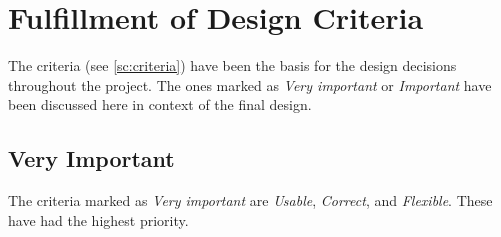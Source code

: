 \section{Fulfillment of Design Criteria}\label{sc:discCriteria}
The criteria (see \autoref{sc:criteria}) have been the basis for the design decisions throughout the project. The ones marked as \textit{Very important} or \textit{Important} have been discussed here in context of the final design.

\subsection{Very Important} \label{ssc:discCriteriaVeryImportant}
The criteria marked as \textit{Very important} are \textit{Usable}, \textit{Correct}, and \textit{Flexible}. These have had the highest priority.

